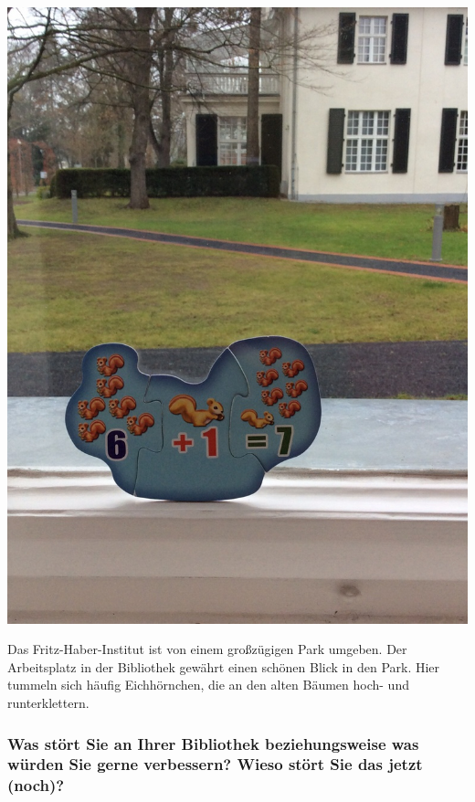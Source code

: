\begin{center}
\includegraphics{fhi/img/parkblick.jpg}
\end{center}

Das Fritz-Haber-Institut ist von einem großzügigen Park umgeben. Der
Arbeitsplatz in der Bibliothek gewährt einen schönen Blick in den Park.
Hier tummeln sich häufig Eichhörnchen, die an den alten Bäumen hoch- und
runterklettern.

\hypertarget{was-stuxf6rt-sie-an-ihrer-bibliothek-beziehungsweise-was-wuxfcrden-sie-gerne-verbessern-wieso-stuxf6rt-sie-das-jetzt-noch}{%
\subsubsection*{Was stört Sie an Ihrer Bibliothek beziehungsweise was würden
Sie gerne verbessern? Wieso stört Sie das jetzt
(noch)?}\label{was-stuxf6rt-sie-an-ihrer-bibliothek-beziehungsweise-was-wuxfcrden-sie-gerne-verbessern-wieso-stuxf6rt-sie-das-jetzt-noch}}

